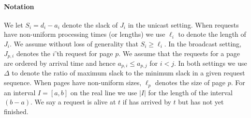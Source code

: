 \paragraph{Notation}
We let $S_i = d_i - a_i$ denote the slack of $J_i$ in the unicast
setting. When requests have non-uniform processing times (or lengths) we
use $\ell_i$ to denote the length of $J_i$. We assume without loss
of generality that $S_i \ge \ell_i$. In the broadcast setting,
$J_{p,i}$ denotes the $i$'th request for page $p$. We assume that the
requests for a page are ordered by arrival time and hence $a_{p,i}
\le a_{p,j}$ for $i < j$. In both settings we use $\Delta$ to denote
the ratio of maximum slack to the minimum slack in a given request
sequence. When pages have non-uniform sizes, $\ell_p$ denotes the size of page $p$.  For an interval $I = [a,b]$ on the real line we use $|I|$
for the length of the interval $(b-a)$. We say a request is alive
 at $t$ if has arrived by $t$ but has not yet finished.
